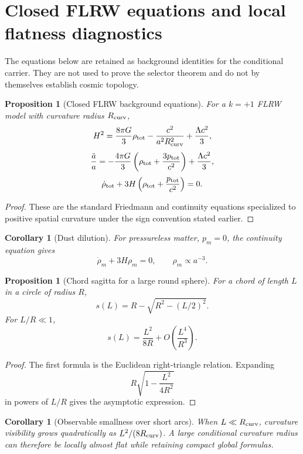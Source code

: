 \documentclass[11pt,a4paper]{article}
\newtheorem{proposition}[theorem]{Proposition}
\newtheorem{corollary}[theorem]{Corollary}
\begin{document}
\section{Closed FLRW equations and local flatness diagnostics}

The equations below are retained as background identities for the conditional carrier.  They are not used to prove the selector theorem and do not by themselves establish cosmic topology.

\begin{proposition}[Closed FLRW background equations]
For a $k=+1$ FLRW model with curvature radius $R_{\rm curv}$,
\[
H^2=\frac{8\pi G}{3}\rho_{\rm tot}
-\frac{c^2}{a^2R_{\rm curv}^2}
+\frac{\Lambda c^2}{3},
\]
\[
\frac{\ddot a}{a}
=
-\frac{4\pi G}{3}
\left(\rho_{\rm tot}+\frac{3p_{\rm tot}}{c^2}\right)
+\frac{\Lambda c^2}{3},
\]
\[
\dot\rho_{\rm tot}
+
3H\left(\rho_{\rm tot}+\frac{p_{\rm tot}}{c^2}\right)=0.
\]
\end{proposition}
\begin{proof}
These are the standard Friedmann and continuity equations specialized to positive spatial curvature under the sign convention stated earlier.
\end{proof}

\begin{corollary}[Dust dilution]
For pressureless matter, $p_m=0$, the continuity equation gives
\[
\dot\rho_m+3H\rho_m=0,
\qquad
\rho_m\propto a^{-3}.
\]
\end{corollary}

\begin{proposition}[Chord sagitta for a large round sphere]
For a chord of length $L$ in a circle of radius $R$,
\[
s(L)=R-\sqrt{R^2-(L/2)^2}.
\]
For $L/R\ll1$,
\[
s(L)=\frac{L^2}{8R}+O\left(\frac{L^4}{R^3}\right).
\]
\end{proposition}
\begin{proof}
The first formula is the Euclidean right-triangle relation.  Expanding
\[
R\sqrt{1-\frac{L^2}{4R^2}}
\]
in powers of $L/R$ gives the asymptotic expression.
\end{proof}

\begin{corollary}[Observable smallness over short arcs]
When $L\ll R_{\rm curv}$, curvature visibility grows quadratically as $L^2/(8R_{\rm curv})$.  A large conditional curvature radius can therefore be locally almost flat while retaining compact global formulas.
\end{corollary}
\end{document}
